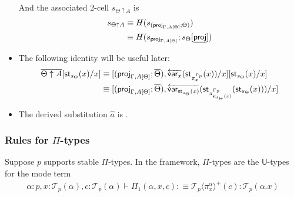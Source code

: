 \documentclass[10pt]{article}
\theoremstyle{definition}
\newcommand{\yields}{\vdash}
\newcommand{\rewrite}[2]{\overleftarrow{#1}(#2)}
\newcommand\StI[2]{\ensuremath{\mathsf{st}_{#1}(#2)}}
\newcommand\TrPlus[2]{\ensuremath{{#1}^+(#2)}}
\newcommand\proj[1]{\ensuremath{\mathsf{proj}_{#1}}}
\newcommand\var[1]{\ensuremath{\mathsf{var}_{#1}}}
\newcommand\El[2]{\mathcal{T}_{#1}(#2)}
\newcommand\ApEl[2]{\mathcal{T}_{#1}\langle#2\rangle}
\begin{document}
\begin{itemize}
And the associated 2-cell $s_{\Theta \uparrow A}$ is
\begin{align*}
s_{\Theta \uparrow A} 
&\equiv H(s_{(\proj{\Gamma, A[\Theta]};\Theta)}) \\
&\equiv H(s_{\proj{\Gamma, A[\Theta]}} ; s_{\Theta}[\downstairs{\mathsf{proj}}])
\end{align*}

\item The following identity will be useful later:
\begin{align*}
\upstairs{\Theta \uparrow A}[\StI{s_\Theta}{x}/x]
&\equiv [(\proj{\Gamma, A[\Theta]};  \upstairs{\Theta}) , \rewrite{\var{x}}{\StI{\pi^{\asdep{\Gamma}}_x}{x}}/x][\StI{s_\Theta}{x}/x] \\
&\equiv [(\proj{\Gamma, A[\Theta]};  \upstairs{\Theta}) , \rewrite{\var{\StI{s_\Theta}{x}}}{\StI{\pi^{\asdep{\Gamma}}_{\StI{s_\Theta}{x}}}{\StI{s_\Theta}{x}}}/x] \\
\end{align*}

\item The derived substitution $\hat{a}$ is .
\end{itemize}

\subsubsection{Rules for $\Pi$-types}

Suppose $p$ supports stable $\Pi$-types. In the framework, $\Pi$-types are the $\mathsf{U}$-types for the mode term
\begin{align*}
\alpha : p, x : \El{p}{\alpha}, c : \El{p}{\alpha} \yields \Pi_1(\alpha,x,c) :\equiv \TrPlus{\ApEl{p}{\pi^\alpha_x}}{c} : \El{p}{\alpha.x}
\end{align*}
\end{document}
